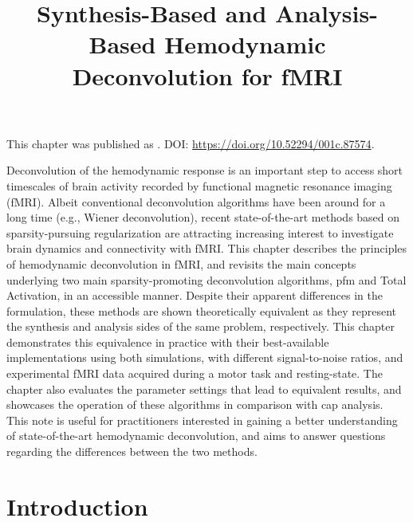 \title{Synthesis-Based and Analysis-Based Hemodynamic Deconvolution for fMRI}
\label{cha:synthesis_analysis}

\begin{framed}\noindent This chapter was published as
. DOI:
\url{https://doi.org/10.52294/001c.87574}.
\end{framed}

Deconvolution of the hemodynamic response is an important step to access short
timescales of brain activity recorded by functional magnetic resonance imaging
(fMRI). Albeit conventional deconvolution algorithms have been around for a long
time (e.g., Wiener deconvolution), recent state-of-the-art methods based on
sparsity-pursuing regularization are attracting increasing interest to
investigate brain dynamics and connectivity with fMRI. This chapter describes
the principles of hemodynamic deconvolution in fMRI, and revisits the main
concepts underlying two main sparsity-promoting deconvolution algorithms,
\acrlong*{pfm} and Total Activation, in an accessible manner. Despite their
apparent differences in the formulation, these methods are shown theoretically
equivalent as they represent the synthesis and analysis sides of the same
problem, respectively. This chapter demonstrates this equivalence in practice
with their best-available implementations using both simulations, with different
signal-to-noise ratios, and experimental fMRI data acquired during a motor task
and resting-state. The chapter also evaluates the parameter settings that lead
to equivalent results, and showcases the operation of these algorithms in
comparison with \acrlong*{cap} analysis. This note is useful for practitioners
interested in gaining a better understanding of state-of-the-art hemodynamic
deconvolution, and aims to answer questions regarding the differences between
the two methods.

\section{Introduction}
\label{sec:synthesis_introduction}

